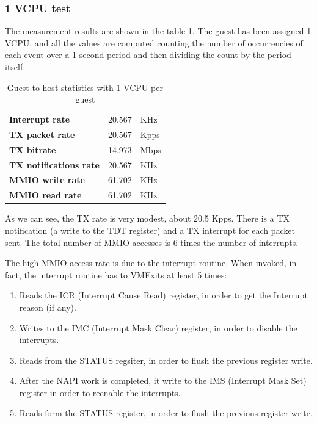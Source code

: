 \subsubsection{1 VCPU test}
\label{sec:e1000-tx-g2h1vcpu}
The measurement results are shown in the table \ref{tab:e1000-tx-g2h1vcpu}. The guest has been assigned 1 VCPU, and all the values are computed
counting the number of occurrencies of each event over a 1 second period and then dividing the count by the period itself.

\begin{table}
\begin{center}
\begin{tabular}{lrl}
\toprule
\textbf{Interrupt rate} & 20.567 & KHz\\
\textbf{TX packet rate} & 20.567 & Kpps\\
\textbf{TX bitrate} & 14.973 & Mbps\\
\textbf{TX notifications rate} & 20.567 & KHz\\
\textbf{MMIO write rate} & 61.702 & KHz\\
\textbf{MMIO read rate} & 61.702 & KHz\\
\bottomrule
\end{tabular}
\end{center}
\caption{Guest to host statistics with 1 VCPU per guest}
\label{tab:e1000-tx-g2h1vcpu}
\end{table}

As we can see, the TX rate is very modest, about 20.5 Kpps. There is a TX notification (a write to the TDT register) and a TX interrupt for 
each packet sent. The total number of MMIO accesses is 6 times the number of interrupts.

The high MMIO access rate is due to the interrupt routine. 
When invoked, in fact, the interrupt routine has to VMExits at least 5 times:
\begin{enumerate}
    \item Reads the ICR (Interrupt Cause Read) register, in order to get the Interrupt reason (if any).
    \item Writes to the IMC (Interrupt Mask Clear) register, in order to disable the interrupts.
    \item Reads from the STATUS regsiter, in order to flush the previous register write.
    \item After the NAPI work is completed, it write to the IMS (Interrupt Mask Set) register in order to reenable the interrupts.
    \item Reads form the STATUS register, in order to flush the previous register write.
\end{enumerate}

